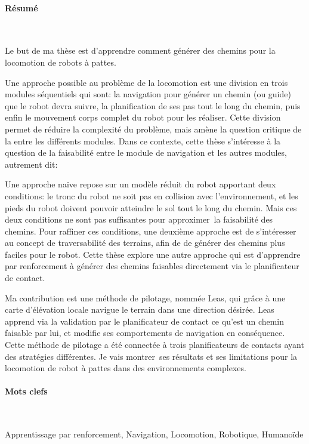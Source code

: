\noindent\makebox[\linewidth]{\rule{0.6\textwidth}{2pt}}



\newpage


\noindent\makebox[\linewidth]{\rule{0.6\textwidth}{2pt}}


\paragraph{Résumé}~

Le but de ma thèse est d’apprendre comment générer des chemins pour la locomotion de robots à pattes.

Une approche possible au problème de la locomotion est une division en trois modules séquentiels qui sont: la navigation pour générer un chemin (ou guide) que le robot devra suivre, la planification de ses pas tout le long du chemin, puis enfin le mouvement corps complet du robot pour les réaliser. Cette division permet de réduire la complexité du problème, mais amène la question critique de la  entre les différents modules. Dans ce contexte, cette thèse s'intéresse à la question de la faisabilité entre le module de navigation et les autres modules, autrement dit: 

Une approche naïve repose sur un modèle réduit du robot apportant deux conditions: le tronc du robot ne soit pas en collision avec l'environnement, et les pieds du robot doivent pouvoir atteindre le sol tout le long du chemin. Mais ces deux conditions ne sont pas suffisantes pour approximer la faisabilité des chemins. Pour raffiner ces conditions, une deuxième approche est de s'intéresser au concept de traversabilité des terrains, afin de de générer des chemins plus faciles pour le robot. Cette thèse explore une autre approche qui est d'apprendre par renforcement à générer des chemins faisables directement via le planificateur de contact.

Ma contribution est une méthode de pilotage, nommée Leas, qui grâce à une carte d'élévation locale navigue le terrain dans une direction désirée. Leas apprend via la validation par le planificateur de contact ce qu'est un chemin faisable par lui, et modifie ses comportements de navigation en conséquence. Cette méthode de pilotage a été connectée à trois planificateurs de contacts ayant des stratégies différentes. Je vais montrer ses résultats et ses limitations pour la locomotion de robot à pattes dans des environnements complexes.


\paragraph{Mots clefs} ~

Apprentissage par renforcement, Navigation, Locomotion, Robotique, Humanoïde


\noindent\makebox[\linewidth]{\rule{0.6\textwidth}{2pt}}

\normalsize